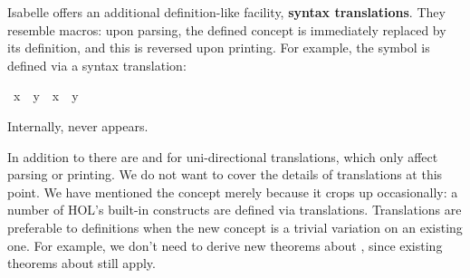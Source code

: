 %
\begin{isabellebody}%
\def\isabellecontext{Translations}%
%
%
\begin{isamarkuptext}%
\label{sec:def-translations}
%
Isabelle offers an additional definition-like facility,
\textbf{syntax translations}.
They resemble macros: upon parsing, the defined concept is immediately
replaced by its definition, and this is reversed upon printing. For example,
the symbol \isa{{\isasymnoteq}} is defined via a syntax translation:%
\end{isamarkuptext}%
\ {\isachardoublequote}x\ {\isasymnoteq}\ y{\isachardoublequote}\ {\isasymrightleftharpoons}\ {\isachardoublequote}{\isasymnot}{\isacharparenleft}x\ {\isacharequal}\ y{\isacharparenright}{\isachardoublequote}%
\begin{isamarkuptext}%
\noindent
Internally, \isa{{\isasymnoteq}} never appears.

In addition to \isa{{\isasymrightleftharpoons}} there are
\isa{{\isasymrightharpoonup}}
and \isa{{\isasymleftharpoondown}}
for uni-directional translations, which only affect
parsing or printing.  We do not want to cover the details of
translations at this point.  We have mentioned the concept merely because it
crops up occasionally: a number of HOL's built-in constructs are defined
via translations.  Translations are preferable to definitions when the new 
concept is a trivial variation on an existing one.  For example, we
don't need to derive new theorems about \isa{{\isasymnoteq}}, since existing theorems
about \isa{{\isacharequal}} still apply.%
%
%
\end{isamarkuptext}%
\end{isabellebody}%
